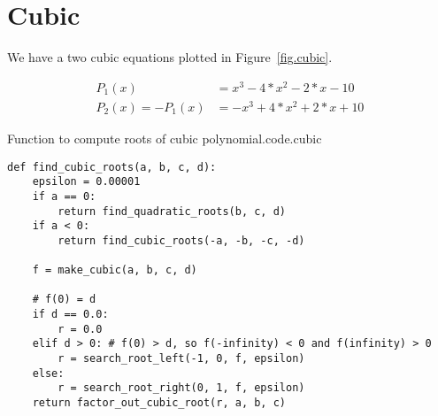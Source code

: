 \section{Cubic}
\label{sec.cubic}

We have a two cubic equations plotted in Figure~\ref{fig.cubic}.

\begin{align*}
  P_1(x) &= x^3 - 4*x^2 - 2*x - 10\\
  P_2(x) = -P_1(x) &= -x^3 + 4*x^2 + 2*x + 10
\end{align*}


\begin{listing}{Function to compute roots of cubic polynomial.}{code.cubic}
\begin{minipage}[c]{0.98\textwidth}\begin{lstlisting}
def find_cubic_roots(a, b, c, d):
    epsilon = 0.00001
    if a == 0:
        return find_quadratic_roots(b, c, d)
    if a < 0:
        return find_cubic_roots(-a, -b, -c, -d)

    f = make_cubic(a, b, c, d)

    # f(0) = d
    if d == 0.0:
        r = 0.0
    elif d > 0: # f(0) > d, so f(-infinity) < 0 and f(infinity) > 0
        r = search_root_left(-1, 0, f, epsilon)
    else:
        r = search_root_right(0, 1, f, epsilon)
    return factor_out_cubic_root(r, a, b, c)
\end{lstlisting}\end{minipage}\end{listing}
